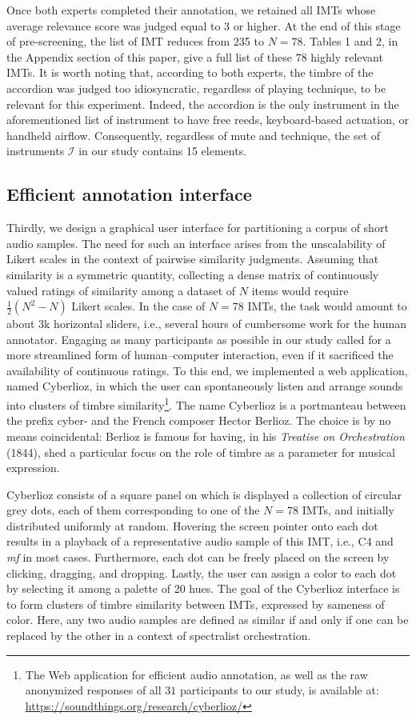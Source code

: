 \documentclass{bmcart}
\makeatletter
\newcommand*{\ie}{i.e.,\@\xspace}
\makeatother
\begin{document}
Once both experts completed their annotation, we retained all IMTs whose average relevance score was judged equal to 3 or higher.
At the end of this stage of pre-screening, the list of IMT reduces from 235 to $N=78$.
Tables 1 and 2, in the Appendix section of this paper, give a full list of these 78 highly relevant IMTs.
It is worth noting that, according to both experts, the timbre of the accordion was judged too idiosyncratic, regardless of playing technique, to be relevant for this experiment.
Indeed, the accordion is the only instrument in the aforementioned list of 
instrument to have free reeds, keyboard-based actuation, or handheld airflow.
Consequently, regardless of mute and technique, the set of instruments $\mathcal{I}$ in our study contains 15 elements.

\subsection*{Efficient annotation interface}
Thirdly, we design a graphical user interface for partitioning a corpus of short audio samples.
The need for such an interface arises from the unscalability of Likert scales in the context of pairwise similarity judgments.
Assuming that similarity is a symmetric quantity, collecting a dense matrix of continuously valued ratings of similarity among a dataset of $N$ items would require $\frac{1}{2}(N^2-N)$ Likert scales.
In the case of $N=78$ IMTs, the task would amount to about 3k horizontal sliders, \ie{} several hours of cumbersome work for the human annotator.
Engaging as many participants as possible in our study called for a more streamlined form of human--computer interaction, even if it sacrificed the availability of continuous ratings.
To this end, we implemented a web application, named Cyberlioz, in which the user can spontaneously listen and arrange sounds into clusters of timbre similarity\footnote{The Web application for efficient audio annotation, as well as the raw anonymized responses of all $31$ participants to our study, is available at: \url{https://soundthings.org/research/cyberlioz/}}.
The name Cyberlioz is a portmanteau between the prefix cyber- and the French composer Hector Berlioz.
The choice is by no means coincidental: Berlioz is famous for having, in his \emph{Treatise on Orchestration} (1844), shed a particular focus on the role of timbre as a parameter for musical expression.
 
 
Cyberlioz consists of a square panel on which is displayed a collection of circular grey dots, each of them corresponding to one of the $N=78$ IMTs, and initially distributed uniformly at random.
Hovering the screen pointer onto each dot results in a playback of a representative audio sample of this IMT, \ie{} C4 and \emph{mf} in most cases. %
Furthermore, each dot can be freely placed on the screen by clicking, dragging, and dropping.
Lastly, the user can assign a color to each dot by selecting it among a palette of 20 hues.
The goal of the Cyberlioz interface is to form clusters of timbre similarity between IMTs, expressed by sameness of color.
Here, any two audio samples are defined as similar if and only if one can be replaced by the other in a context of spectralist orchestration.
\end{document}
